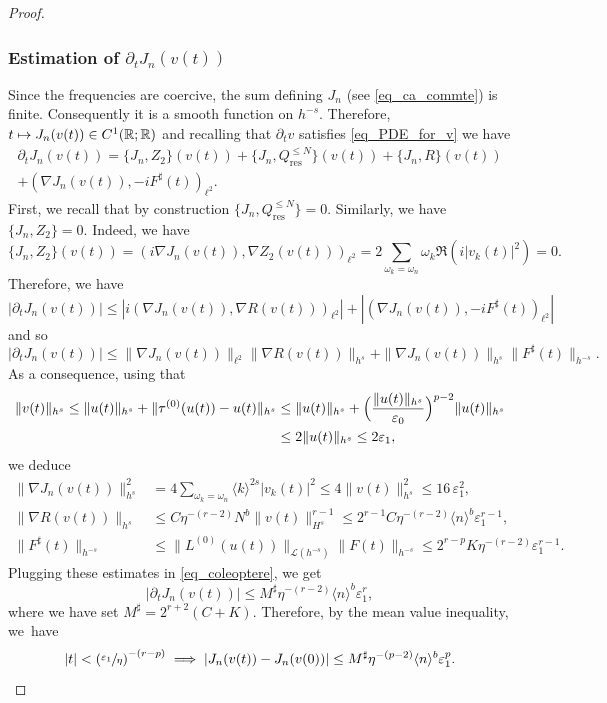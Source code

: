 \documentclass[JEP,XML,SOM,Unicode,NoEqCountersInSection,published]{cedram}
\newcommand\mto{\mathchoice{\longmapsto}{\mapsto}{\mapsto}{\mapsto}}
\theoremstyle{definition}
\begin{document}
\begin{proof}
\subsubsection*{Estimation of $\partial_t J_n(v(t))$}
Since the frequencies are coercive, the sum defining $J_n$ (see \eqref{eq_ca_commte}) is finite. Consequently it is a smooth function on $h^{-s}$. Therefore, $t\mto J_n(v(t)) \in C^1(\mathbb{R};\mathbb{R})$ and recalling that $\partial_t v$ satisfies \eqref{eq_PDE_for_v} we have
\begin{multline*}
\partial_t J_n(v(t)) = \{J_n, Z_2 \}(v(t))+ \{J_n, Q^{\leq N}_{\mathrm{res}} \}(v(t)) + \{J_n, R \}(v(t)) \\+ (\nabla J_n(v(t)),-i F^\sharp(t))_{\ell^2}.
\end{multline*}
First, we recall that by construction $\{J_n, Q^{\leq N}_{\mathrm{res}} \}=0$. Similarly, we have $\{J_n, Z_2 \}=0$. Indeed, we have
\[
\{J_n, Z_2 \}(v(t)) = (i\nabla J_n(v(t)), \nabla Z_2(v(t)))_{\ell^2}=2 \sum_{\omega_k = \omega_n} \omega_k \Re (i |v_k(t)|^2) = 0.
\]
Therefore, we have $|\partial_t J_n(v(t))| \leq | i(\nabla J_n(v(t)),\nabla R(v(t)))_{\ell^2} | +| (\nabla J_n(v(t)),-i F^\sharp(t))_{\ell^2}|$ and so
\begin{equation}
\label{eq_coleoptere}
|\partial_t J_n(v(t))| \leq \| \nabla J_n (v(t)) \|_{\ell^2} \| \nabla R (v(t)) \|_{h^s} + \| \nabla J_n (v(t)) \|_{h^{s}} \| F^\sharp(t) \|_{h^{-s}}.
\end{equation}
As a consequence, using that
\begin{equation*}
\begin{split}
\|v(t)\|_{h^s} \leq \|u(t) \|_{h^s} + \| \tau^{(0)}(u(t)) - u(t) \|_{h^s} &\leq \|u(t) \|_{h^s} + \Bigl(\frac{\| u(t)\|_{h^s}}{\varepsilon_0} \Bigr)^{p-2} \|u(t)\|_{h^s} \\
&\leq 2 \|u(t) \|_{h^s} \leq 2\varepsilon_1,
\end{split}
\end{equation*}
we deduce
\begin{equation*}
\begin{split}
\| \nabla J_n (v(t)) \|_{h^s}^2 &= 4 \sum_{\omega_k = \omega_n} \langle k \rangle^{2s} |v_k(t)|^2 \leq 4 \| v(t) \|_{h^s}^2 \leq 16\, \varepsilon_1^2, \\
\| \nabla R (v(t)) \|_{h^s} &\leq C \eta^{-(r-2)} N^{b} \|v(t)\|_{H^s}^{r-1} \leq 2^{r-1} C \eta^{-(r-2)} \langle n\rangle^{b} \varepsilon_1^{r-1}, \\
\| F^\sharp(t) \|_{h^{-s}} &\leq \| L^{(0)}(u(t)) \|_{\mathscr{L}(h^{-s})} \| F(t) \|_{h^{-s}} \leq 2^{r-p} K \eta^{-(r-2)} \varepsilon_1^{r-1}.
\end{split}
\end{equation*}
Plugging these estimates in \eqref{eq_coleoptere}, we get
\[
|\partial_t J_n(v(t))| \leq M^\sharp \eta^{-(r-2)} \langle n \rangle^{b} \varepsilon_1^{r},
\]
where we have set $M^\sharp = 2^{r+2} (C+K)$.
Therefore, by the mean value inequality, we~have
\[
|t|< \left(\sfrac{ \varepsilon_1}{\eta} \right)^{-(r-p)} \implies |J_n(v(t)) - J_n(v(0))| \leq M^\sharp \eta^{-(p-2)} \langle n \rangle^{b} \varepsilon_1^{p}.
\]


\end{proof}
\end{document}
